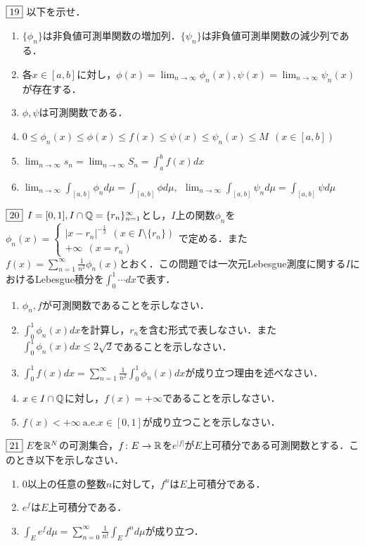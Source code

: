 \documentclass[dvipdfmx, leqno]{jsreport}
\begin{document}
\begin{tcolorbox}$\fbox{19}$
    以下を示せ．
\begin{enumerate}
    \item $\{\phi_n\}$は非負値可測単関数の増加列．$\{\psi_n\}$は非負値可測単関数の減少列である．
    \item 各$x\in [a, b]$に対し，$\phi(x)= \lim_{n\to \infty} \phi_n(x), \psi(x)= \lim_{n\to \infty} \psi_n(x)$が存在する．
    \item $\phi, \psi$は可測関数である．
    \item $0\le \phi_n(x)\le \phi(x)\le f(x)\le \psi(x)\le \psi_n(x)\le M\ \ (x\in [a, b])$
    \item $\lim_{n\to \infty}s_n= \lim_{n\to \infty}S_n= \int_a^b f(x)dx$
    \item $\lim_{n\to \infty}\int_{[a, b]} \phi_n d\mu= \int_{[a, b]} \phi d\mu,\ \ \lim_{n\to \infty} \int_{[a, b]}\psi_nd\mu= \int_{[a, b]}\psi d\mu$
\end{enumerate}
\end{tcolorbox}
\begin{tcolorbox}$\fbox{20}$
    $I= [0, 1], I\cap \mathbb{Q}= \{r_n\}_{n= 1}^\infty$とし，$I$上の関数$\phi_n$を$\phi_n(x)= \begin{cases}|x- r_n|^{-\frac{1}{2}}\ \ (x\in I\setminus\{r_n\})\\ + \infty\ \ (x= r_n)\end{cases}$で定める．また$f(x)= \sum_{n= 1}^\infty \frac{1}{n^2}\phi_n(x)$とおく．この問題では一次元Lebesgue測度に関する$I$におけるLebesgue積分を$\int_0^1\cdots dx$で表す．
\begin{enumerate}
    \item $\phi_n, f$が可測関数であることを示しなさい．
    \item $\int_0^1 \phi_n(x)dx$を計算し，$r_n$を含む形式で表しなさい．また$\int_0^1 \phi_n(x)dx\le 2\sqrt{2}$であることを示しなさい．
    \item $\int_0^1 f(x)dx= \sum_{n= 1}^\infty \frac{1}{n^2}\int_0^1 \phi_n(x)dx$が成り立つ理由を述べなさい．
    \item $x\in I\cap \mathbb{Q}$に対し，$f(x)= +\infty$であることを示しなさい．
    \item $f(x)< +\infty \ \mathrm{a.e.} x\in [0, 1]$が成り立つことを示しなさい．
\end{enumerate}
\end{tcolorbox}
\begin{tcolorbox}$\fbox{21}$
    $E$を$\mathbb{R}^N$の可測集合，$f\colon E\to \mathbb{R}$を$e^{|f|}$が$E$上可積分である可測関数とする．このとき以下を示しなさい．
\begin{enumerate}
    \item 0以上の任意の整数$n$に対して，$f^n$は$E$上可積分である．
    \item $e^f$は$E$上可積分である．
    \item $\int_E e^f d\mu= \sum_{n= 0}^\infty \frac{1}{n!}\int_E f^n d\mu$が成り立つ．
\end{enumerate}

\end{tcolorbox}
\end{document}

